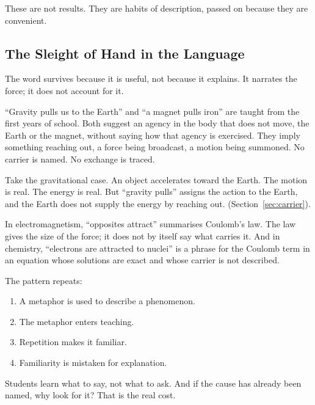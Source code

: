 \documentclass[11pt,a4paper]{article}
\begin{document}
These are not results. They are habits of description, passed on because they are convenient.

\subsection*{The Sleight of Hand in the Language}

The word survives because it is useful, not because it explains. It narrates the force; it does not account for it.

``Gravity pulls us to the Earth'' and ``a magnet pulls iron'' are taught from the first years of school. Both suggest an agency in the body that does not move, the Earth or the magnet, without saying how that agency is exercised. They imply something reaching out, a force being broadcast, a motion being summoned. No carrier is named. No exchange is traced.

Take the gravitational case. An object accelerates toward the Earth. The motion is real. The energy is real. But ``gravity pulls'' assigns the action to the Earth, and the Earth does not supply the energy by reaching out.  (Section~\ref{sec:carrier}).

In electromagnetism, ``opposites attract'' summarises Coulomb's law. The law gives the size of the force; it does not by itself say what carries it. And in chemistry, ``electrons are attracted to nuclei'' is a phrase for the Coulomb term in an equation whose solutions are exact and whose carrier is not described. 

The pattern repeats:
\begin{enumerate}
  \item A metaphor is used to describe a phenomenon.
  \item The metaphor enters teaching.
  \item Repetition makes it familiar.
  \item Familiarity is mistaken for explanation.
\end{enumerate}

Students learn what to say, not what to ask. And if the cause has already been named, why look for it? That is the real cost. 
\end{document}
